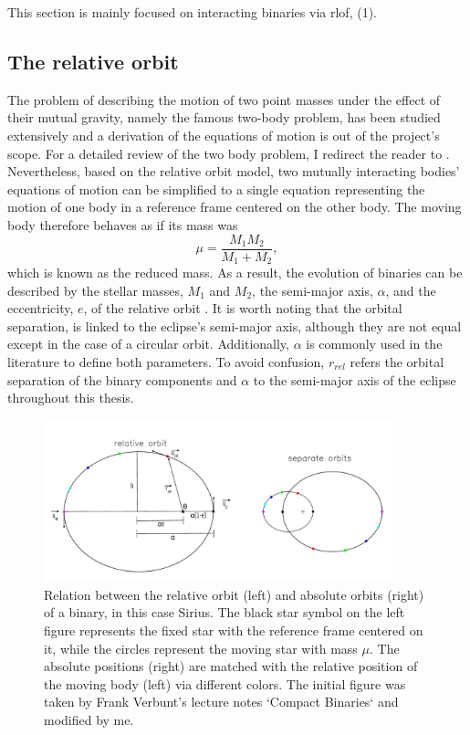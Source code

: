 This section is mainly focused on interacting binaries via \ac{rlof}, (1). 

\subsection{The relative orbit}

The problem of describing the motion of two point masses
under the effect of their mutual gravity, namely the famous two-body problem, has been studied extensively and a derivation of the equations of motion is out of the project's scope. For a detailed review of the two body problem, I redirect the reader to  \cite{postnov2014evolution}. Nevertheless, based on the relative orbit model, two mutually interacting bodies' equations of motion can be simplified to a single equation representing the motion of one body in a reference frame centered on the other body. The moving body therefore behaves as if its mass was
\begin{equation}\label{eq:reduced_mass}
    \mu= \frac{M_1 M_2}{M_1 + M_2},
\end{equation}
which is known as the reduced mass. As a result, the evolution of binaries can be described by the stellar masses, $M_1$ and $M_2$, the semi-major axis, $\alpha$, and the eccentricity, $e$, of the relative orbit \citep{sana2012binary,postnov2014evolution,toonen2014popcorn}. It is worth noting that the orbital separation, is linked to the eclipse's semi-major axis, although they are not equal except in the case of a circular orbit. Additionally, $\alpha$ is commonly used in the literature to define both parameters. To avoid confusion, $r_{rel}$ refers the orbital separation of the binary components and $\alpha$ to the semi-major axis of the eclipse throughout this thesis.
\begin{figure}[H]
    \centering
    \includegraphics[width=0.9\textwidth]{Thesis/figures/relative_orbit.pdf}
    \caption{Relation between the relative orbit (left) and absolute orbits (right) of a
    binary, in this case Sirius. The black star symbol on the left figure represents the fixed star with the reference frame centered on it, while the circles represent the moving star with mass $\mu$. The absolute positions (right) are matched with the relative position of the moving body (left) via different colors.   The initial figure was taken by Frank Verbunt's lecture notes `Compact Binaries` and modified by me.}
    \label{fig:relative_orbit}
\end{figure}
